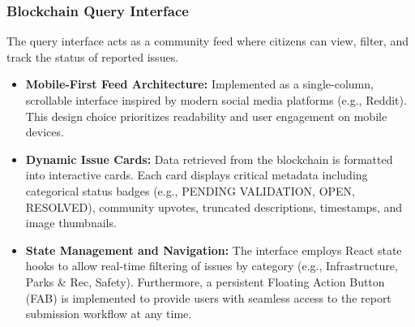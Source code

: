 \subsubsection*{Blockchain Query Interface}
The query interface acts as a community feed where citizens can view, filter, and track the status of reported issues.
\begin{itemize}
    \item \textbf{Mobile-First Feed Architecture:} Implemented as a single-column, scrollable interface inspired by modern social media platforms (e.g., Reddit). This design choice prioritizes readability and user engagement on mobile devices.
    \item \textbf{Dynamic Issue Cards:} Data retrieved from the blockchain is formatted into interactive cards. Each card displays critical metadata including categorical status badges (e.g., PENDING VALIDATION, OPEN, RESOLVED), community upvotes, truncated descriptions, timestamps, and image thumbnails.
    \item \textbf{State Management and Navigation:} The interface employs React state hooks to allow real-time filtering of issues by category (e.g., Infrastructure, Parks \& Rec, Safety). Furthermore, a persistent Floating Action Button (FAB) is implemented to provide users with seamless access to the report submission workflow at any time.
\end{itemize}





